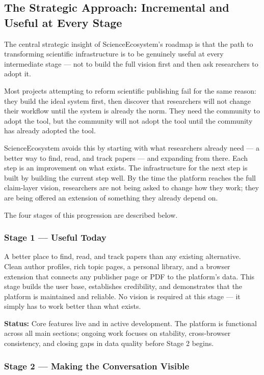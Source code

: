 \subsection*{The Strategic Approach: Incremental and Useful at Every Stage}

The central strategic insight of ScienceEcosystem's roadmap is that the path to
transforming scientific infrastructure is to be genuinely useful at every
intermediate stage — not to build the full vision first and then ask researchers
to adopt it.

Most projects attempting to reform scientific publishing fail for the same
reason: they build the ideal system first, then discover that researchers will
not change their workflow until the system is already the norm. They need the
community to adopt the tool, but the community will not adopt the tool until
the community has already adopted the tool.

ScienceEcosystem avoids this by starting with what researchers already need —
a better way to find, read, and track papers — and expanding from there. Each
step is an improvement on what exists. The infrastructure for the next step is
built by building the current step well. By the time the platform reaches the
full claim-layer vision, researchers are not being asked to change how they
work; they are being offered an extension of something they already depend on.

The four stages of this progression are described below.

\subsubsection*{Stage 1 — Useful Today}

A better place to find, read, and track papers than any existing alternative.
Clean author profiles, rich topic pages, a personal library, and a browser
extension that connects any publisher page or PDF to the platform's data.
This stage builds the user base, establishes credibility, and demonstrates
that the platform is maintained and reliable. No vision is required at this
stage — it simply has to work better than what exists.

\textbf{Status:} Core features live and in active development. 
The platform is functional across all main sections; ongoing work focuses on stability, 
cross-browser consistency, and closing gaps in data quality before Stage 2 begins.

\subsubsection*{Stage 2 — Making the Conversation Visible}

